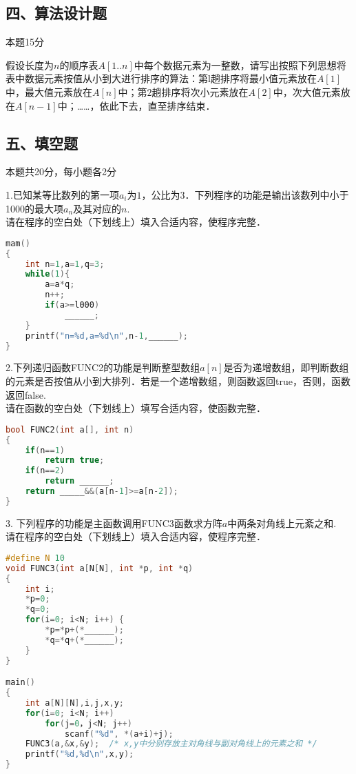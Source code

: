 \subsection{四、算法设计题}

本题15分

  假设长度为$n$的顺序表$A[1..n]$中每个数据元素为一整数，请写出按照下列思想将表中数据元素按值从小到大进行排序的算法：第l趟排序将最小值元素放在$A[1]$中，最大值元素放在$A[n]$中；第$2$趟排序将次小元素放在$A[2]$中，次大值元素放在$A[n-1]$中；……，依此下去，直至排序结束．


\subsection{五、填空题}

本题共20分，每小题各2分

1.已知某等比数列的第一项$a_i$为$1$，公比为$3$．下列程序的功能是输出该数列中小于1000的最大项$a_n$及其对应的$n$. \\
请在程序的空白处（下划线上）填入合适内容，使程序完整．
\begin{lstlisting}[language=cpp]
mam()
{
    int n=1,a=1,q=3;
    while(1){
        a=a*q;
        n++;
        if(a>=l000)
            ______;
    }
    printf("n=%d,a=%d\n",n-1,______);
}
\end{lstlisting}

2.下列递归函数FUNC2的功能是判断整型数组$a[n]$是否为递增数组，即判断数组的元素是否按值从小到大排列．若是一个递增数组，则函数返回true，否则，函数返回false. \\
请在函数的空白处（下划线上）填写合适内容，使函数完整．
\begin{lstlisting}[language=cpp]
bool FUNC2(int a[], int n)
{
    if(n==1)
        return true;
    if(n==2)
        return ______;
    return _____&&(a[n-1]>=a[n-2]);
}


\end{lstlisting}

3. 下列程序的功能是主函数调用FUNC3函数求方阵$a$中两条对角线上元紊之和. \\
请在程序的空白处（下划线上）填入合适内容，使程序完整．
\begin{lstlisting}[language=cpp]
#define N 10
void FUNC3(int a[N[N], int *p, int *q)
{
    int i;
    *p=0;
    *q=0;
    for(i=0; i<N; i++) {
        *p=*p+(*______);
        *q=*q+(*______);
    }
}

main()
{
    int a[N][N],i,j,x,y;
    for(i=0; i<N; i++)
        for(j=0，j<N; j++)
            scanf("%d", *(a+i)+j);
    FUNC3(a,&x,&y);  /* x,y中分别存放主对角线与副对角线上的元素之和 */
    printf("%d,%d\n",x,y);
}
\end{lstlisting}

